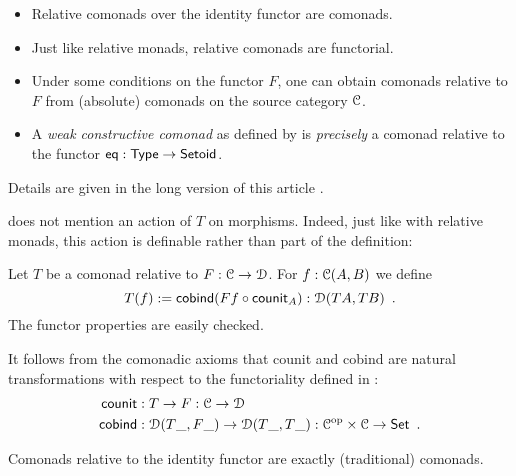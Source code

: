 \documentclass[a4paper,USenglish]{lipics}
\begin{document}
\begin{Short}
\begin{rem}\label{def:lift}
 \begin{itemize}
  \item Relative comonads over the identity functor are comonads.
  \item Just like relative monads, relative comonads are functorial.
  \item Under some conditions on the functor $F$, one can obtain comonads relative to $F$ from (absolute) comonads on the 
 source category $\C$.
  \item A \emph{weak constructive comonad} as defined by \textcite{DBLP:conf/types/MatthesP11}  is \emph{precisely}
  a comonad relative to the functor $\eq : \Set\to\Setoid$.
 \end{itemize}
\noindent
Details are given in the long version of this article \parencite{trimat_coq}.
\end{rem}
\end{Short}


\begin{Long}
  does not mention an action of $T$ on morphisms. Indeed, just like with relative monads, this action is definable rather than part of the definition:
\begin{defn}%
\label{def:lift}
 Let $T$ be a  comonad relative to $F:\C\to\D$.
 For $f : \C(A,B)$ we define
  \[ T(f) := \cobind(\comp{\counit_A}{Ff}) : \D(TA,TB) \enspace .\] 
 The functor properties are easily checked.
\end{defn}

\begin{rem}
 It follows from the comonadic axioms that
 counit and cobind are natural transformations with respect to the functoriality defined in :
 \begin{align*}
     \counit &: T \to F : \C\to \D \\
     \cobind &: \D(T\_, F\_) \to \D(T\_, T\_) : \C^{\text{op}} \times \C \to \Ens \enspace .
 \end{align*}

\end{rem}


\end{Long}

\begin{Long}
Comonads relative to the identity functor are exactly (traditional) comonads.
\end{Long}
\end{document}
